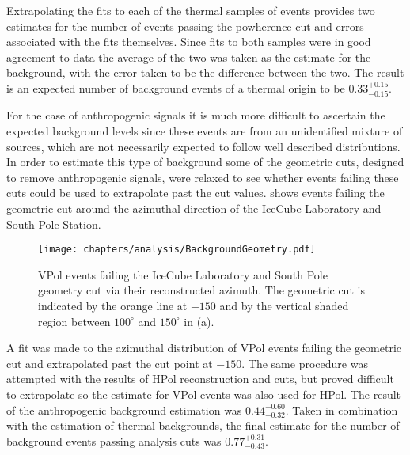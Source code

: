 Extrapolating the fits to each of the thermal samples of events provides two estimates for the number of events passing the powherence cut and errors associated with the fits themselves. Since fits to both samples were in good agreement to data the average of the two was taken as the estimate for the background, with the error taken to be the difference between the two. The result is an expected number of background events of a thermal origin to be $0.33^{+0.15}_{-0.15}$.

For the case of anthropogenic signals it is much more difficult to ascertain the expected background levels since these events are from an unidentified mixture of sources, which are not necessarily expected to follow well described distributions. In order to estimate this type of background some of the geometric cuts, designed to remove anthropogenic signals, were relaxed to see whether events failing these cuts could be used to extrapolate past the cut values.  shows events failing the geometric cut around the azimuthal direction of the IceCube Laboratory and South Pole Station. 

\begin{figure}
  \texttt{[image: chapters/analysis/BackgroundGeometry.pdf]}
  \caption{VPol events failing the IceCube Laboratory and South Pole geometry cut via their reconstructed azimuth. The geometric cut is indicated by the orange line at $-150$ and by the vertical shaded region between $100^{\circ}$ and $150^{\circ}$ in  (a).}
  \label{fig:Analysis:Background-Estimation:Anthropogenic-Background}
\end{figure}

A fit was made to the azimuthal distribution of VPol events failing the geometric cut and extrapolated past the cut point at $-150$. The same procedure was attempted with the results of HPol reconstruction and cuts, but proved difficult to extrapolate so the estimate for VPol events was also used for HPol. The result of the anthropogenic background estimation was $0.44^{+0.60}_{-0.32}$. Taken in combination with the estimation of thermal backgrounds, the final estimate for the number of background events passing analysis cuts was $0.77^{+0.31}_{-0.43}$.


